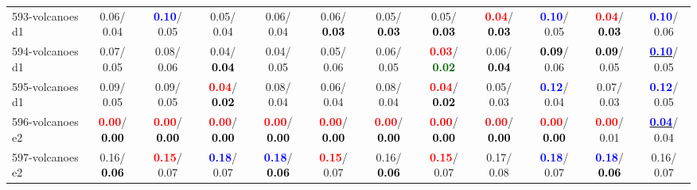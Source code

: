\begin{table}[h]
\begin{center}
{\begin{tabular}{lc|c|c|c|c|c|c|c|c|c|c}
593-volcanoes d1 &   0.06/  0.04 & \textcolor{blue}{\textbf{  0.10}}/  0.05 &   0.05/  0.04 &   0.06/  0.04 &   0.06/\textcolor{black}{\textbf{  0.03}} &   0.05/\textcolor{black}{\textbf{  0.03}} &   0.05/\textcolor{black}{\textbf{  0.03}} & \textcolor{red}{\textbf{  0.04}}/\textcolor{black}{\textbf{  0.03}} & \textcolor{blue}{\textbf{  0.10}}/  0.05 & \textcolor{red}{\textbf{  0.04}}/\textcolor{black}{\textbf{  0.03}} & \textcolor{blue}{\textbf{  0.10}}/  0.06 \\
594-volcanoes d1 &   0.07/  0.05 &   0.08/  0.06 &   0.04/\textcolor{black}{\textbf{  0.04}} &   0.04/  0.05 &   0.05/  0.06 &   0.06/  0.05 & \textcolor{red}{\textbf{  0.03}}/\textcolor{darkgreen}{\textbf{  0.02}} &   0.06/\textcolor{black}{\textbf{  0.04}} & \textcolor{black}{\textbf{  0.09}}/  0.06 & \textcolor{black}{\textbf{  0.09}}/  0.05 & \underline{\textcolor{blue}{\textbf{  0.10}}}/  0.05 \\
595-volcanoes d1 &   0.09/  0.05 &   0.09/  0.05 & \textcolor{red}{\textbf{  0.04}}/\textcolor{black}{\textbf{  0.02}} &   0.08/  0.04 &   0.06/  0.04 &   0.08/  0.04 & \textcolor{red}{\textbf{  0.04}}/\textcolor{black}{\textbf{  0.02}} &   0.05/  0.03 & \textcolor{blue}{\textbf{  0.12}}/  0.04 &   0.07/  0.03 & \textcolor{blue}{\textbf{  0.12}}/  0.05 \\
596-volcanoes e2 & \textcolor{red}{\textbf{  0.00}}/\textcolor{black}{\textbf{  0.00}} & \textcolor{red}{\textbf{  0.00}}/\textcolor{black}{\textbf{  0.00}} & \textcolor{red}{\textbf{  0.00}}/\textcolor{black}{\textbf{  0.00}} & \textcolor{red}{\textbf{  0.00}}/\textcolor{black}{\textbf{  0.00}} & \textcolor{red}{\textbf{  0.00}}/\textcolor{black}{\textbf{  0.00}} & \textcolor{red}{\textbf{  0.00}}/\textcolor{black}{\textbf{  0.00}} & \textcolor{red}{\textbf{  0.00}}/\textcolor{black}{\textbf{  0.00}} & \textcolor{red}{\textbf{  0.00}}/\textcolor{black}{\textbf{  0.00}} & \textcolor{red}{\textbf{  0.00}}/\textcolor{black}{\textbf{  0.00}} & \textcolor{red}{\textbf{  0.00}}/  0.01 & \underline{\textcolor{blue}{\textbf{  0.04}}}/  0.04 \\
597-volcanoes e2 &   0.16/\textcolor{black}{\textbf{  0.06}} & \textcolor{red}{\textbf{  0.15}}/  0.07 & \textcolor{blue}{\textbf{  0.18}}/  0.07 & \textcolor{blue}{\textbf{  0.18}}/\textcolor{black}{\textbf{  0.06}} & \textcolor{red}{\textbf{  0.15}}/  0.07 &   0.16/\textcolor{black}{\textbf{  0.06}} & \textcolor{red}{\textbf{  0.15}}/  0.07 &   0.17/  0.08 & \textcolor{blue}{\textbf{  0.18}}/  0.07 & \textcolor{blue}{\textbf{  0.18}}/\textcolor{black}{\textbf{  0.06}} &   0.16/  0.07 \\ \hline

\end{tabular}}
\end{center}
\end{table}
